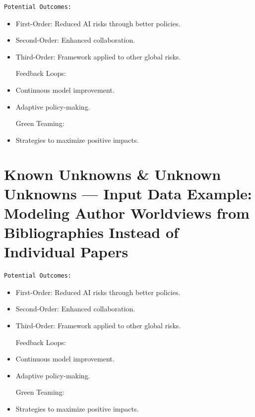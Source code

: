 \documentclass[
  letterpaper,
]{book}
\begin{document}
\begin{verbatim}
Potential Outcomes:
\end{verbatim}

\begin{itemize}
\item
  First-Order: Reduced AI risks through better policies.\\
\item
  Second-Order: Enhanced collaboration.\\
\item
  Third-Order: Framework applied to other global risks.

  Feedback Loops:
\item
  Continuous model improvement.\\
\item
  Adaptive policy-making.

  Green Teaming:
\item
  Strategies to maximize positive impacts.
\end{itemize}

\section{Known Unknowns \& Unknown Unknowns --- Input Data Example:
Modeling Author Worldviews from Bibliographies Instead of Individual
Papers}\label{known-unknowns-unknown-unknowns-input-data-example-modeling-author-worldviews-from-bibliographies-instead-of-individual-papers}

\begin{verbatim}
Potential Outcomes:
\end{verbatim}

\begin{itemize}
\item
  First-Order: Reduced AI risks through better policies.\\
\item
  Second-Order: Enhanced collaboration.\\
\item
  Third-Order: Framework applied to other global risks.

  Feedback Loops:
\item
  Continuous model improvement.\\
\item
  Adaptive policy-making.

  Green Teaming:
\item
  Strategies to maximize positive impacts.
\end{itemize}
\end{document}
